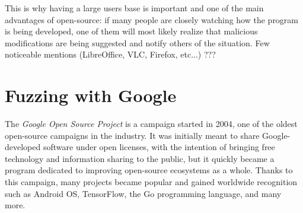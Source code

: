 \documentclass[Lau,oneside]{sapthesis}%
\begin{document}
\newline
This is why having a large users base is important and one of the main advantages of open-source: if many people are closely watching how the program is being developed, one of them will most likely realize that malicious modifications are being suggested and notify others of the situation.
\newline \newline
Few noticeable mentions (LibreOffice, VLC, Firefox, etc...) ???




\newpage
\section{Fuzzing with Google}
The \textit{Google Open Source Project} \cite{ref:google_oss} is a campaign started in 2004, one of the oldest open-source campaigns in the industry. 
\newline
It was initially meant to share Google-developed software under open licenses, with the intention of bringing free technology and information sharing to the public, but it quickly became a program dedicated to improving open-source ecosystems as a whole. 
\newline \newline
Thanks to this campaign, many projects became popular and gained worldwide recognition such as Android OS, TensorFlow, the Go programming language, and many more.


\ \\
\end{document}
